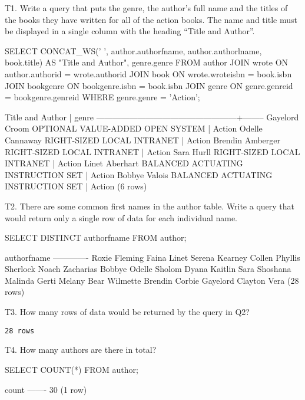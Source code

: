 
T1. Write a query that puts the genre, the author's full name and the titles of the books they have written for all of the action books. The name and title must be displayed in a single column with the heading ``Title and Author''.
\begin{sql}
SELECT CONCAT_WS(' ', author.authorfname, author.authorlname, book.title) AS "Title and Author", genre.genre FROM author
JOIN wrote ON author.authorid = wrote.authorid
JOIN book ON wrote.wroteisbn = book.isbn
JOIN bookgenre ON bookgenre.isbn = book.isbn
JOIN genre ON genre.genreid = bookgenre.genreid
WHERE genre.genre = 'Action';
\end{sql}

\begin{pseudo}
                 Title and Author                  | genre
---------------------------------------------------+--------
 Gayelord Croom OPTIONAL VALUE-ADDED OPEN SYSTEM   | Action
 Odelle Cannaway RIGHT-SIZED LOCAL INTRANET        | Action
 Brendin Amberger RIGHT-SIZED LOCAL INTRANET       | Action
 Sara Hurll RIGHT-SIZED LOCAL INTRANET             | Action
 Linet Aberhart BALANCED ACTUATING INSTRUCTION SET | Action
 Bobbye Valois BALANCED ACTUATING INSTRUCTION SET  | Action
(6 rows)
\end{pseudo}

T2. There are some common first names in the author table. Write a query that would return only a single row of data for each individual name.
\begin{sql}
SELECT DISTINCT authorfname FROM author;
\end{sql}
\begin{pseudo}
 authorfname
-------------
 Roxie
 Fleming
 Faina
 Linet
 Serena
 Kearney
 Collen
 Phyllis
 Sherlock
 Noach
 Zacharias
 Bobbye
 Odelle
 Sholom
 Dyana
 Kaitlin
 Sara
 Shoshana
 Malinda
 Gerti
 Melany
 Bear
 Wilmette
 Brendin
 Corbie
 Gayelord
 Clayton
 Vera
(28 rows)
\end{pseudo}

T3. How many rows of data would be returned by the query in Q2?
\begin{verbatim}
28 rows
\end{verbatim}

T4. How many authors are there in total?
\begin{sql}
SELECT COUNT(*) FROM author;
\end{sql}
\begin{pseudo}
 count
-------
    30
(1 row)
\end{pseudo}

